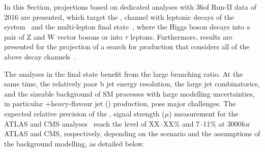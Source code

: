 In this Section, projections based on dedicated analyses with 36\fbinv of Run-II data of 2016 are presented, which target the \ttH, \Htobb channel with leptonic decays of the \ttbar system~\cite{Aaboud:2017rss,Sirunyan:2018mvw} and the \ttH multi-lepton final state~\cite{Aaboud:2017jvq}, where the Higgs boson decays into a pair of Z and W vector bosons or into $\tau$ leptons.
Furthermore, results are presented for the projection of a search for \tH production that considers all of the above decay channels~\cite{Sirunyan:2018lzm}.



The \ttH analyses in the \Htobb final state benefit from the large branching ratio.
At the same time, the relatively poor b jet energy resolution, the large jet combinatorics, and the sizeable background of SM processes with large modelling uncertainties, in particular \ttbar+heavy-flavour jet (\ttHF) production, pose major challenges.
The expected relative precision of the \ttH, \Htobb signal strength ($\mu$) measurement for the ATLAS and CMS analyses~\cite{ATLAS-PHYS-PUB-2018-XY,CMS-PAS-FTR-18-011} reach the level of XX--XX\% and 7--11\% at 3000\fbinv for ATLAS and CMS, respectively, depending on the scenario and the assumptions of the \ttHF background modelling, as detailed below.

